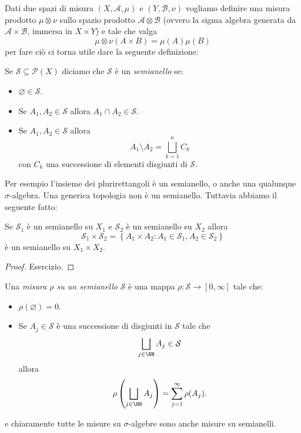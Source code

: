 \documentclass[11pt]{scrartcl}
\newcommand{\eset}{\varnothing}
\newcommand{\parti}[1]{\mathcal{P}\!\left(#1\right)}
\begin{document}
	Dati due spazi di misura $\left(X,\mathcal{A},\mu\right)$ e $\left(Y,\mathcal{B},\nu\right)$ vogliamo definire una misura prodotto $\mu \otimes \nu$ sullo spazio prodotto $\mathcal{A}\otimes \mathcal{B}$ (ovvero la sigma algebra generata da $\mathcal{A}\times \mathcal{B}$, immersa in $X\times Y$) e tale che valga
	$$\mu\otimes \nu (A\times B)=\mu(A)\mu(B)$$
	per fare ciò ci torna utile dare la seguente definizione:
	\begin{definition}[Semianello]
		Se $\mathcal{S}\subseteq \parti{X}$ diciamo che $\mathcal{S}$ è un \textit{semianello} se:
		\begin{itemize}
			\item $\eset\in \mathcal{S}$.
			\item Se $A_1,A_2\in \mathcal{S}$ allora $A_1\cap A_2\in \mathcal{S}$.
			\item Se $A_1,A_2\in \mathcal{S}$ allora 
			$$A_1\setminus A_2 = \bigsqcup_{k=1}^n C_k$$
			con $C_k$ una successione di elementi disgiunti di $\mathcal{S}$. 
		\end{itemize}
	\end{definition}
	Per esempio l'insieme dei plurirettangoli è un semianello, o anche una qualunque $\sigma$-algebra. Una generica topologia non è un semianello. Tuttavia abbiamo il seguente fatto:
	\begin{proposition}
		Se $\mathcal{S}_1$ è un semianello su $X_1$ e $\mathcal{S}_2$ è un semianello su $X_2$ allora 
		$$\mathcal{S}_1\times \mathcal{S}_2 = \left\{A_1\times A_2:A_1\in \mathcal{S}_1,A_2\in \mathcal{S}_2\right\}$$
		è un semianello su $X_1\times X_2$.
	\end{proposition}
	\begin{proof}
		Esercizio.
	\end{proof}
	\begin{definition}
		Una \textit{misura $\rho$ su un semianello} $\mathcal{S}$ è una mappa $\rho:\mathcal{S}\to [0,\infty]$ tale che:
		\begin{itemize}
			\item $\rho(\eset)=0$.
			\item Se $A_j\in \mathcal{S}$ è una successione di disgiunti in $\mathcal{S}$ tale che 
			$$\bigsqcup_{j\in\NN}A_j\in \mathcal{S}$$
			allora 
			$$\rho\left(\bigsqcup_{j\in\NN}A_j\right)=\sum_{j=1}^{\infty}\rho(A_j).$$
		\end{itemize}
		e chiaramente tutte le misure su $\sigma$-algebre sono anche misure su semianelli.
	\end{definition}
\end{document}
